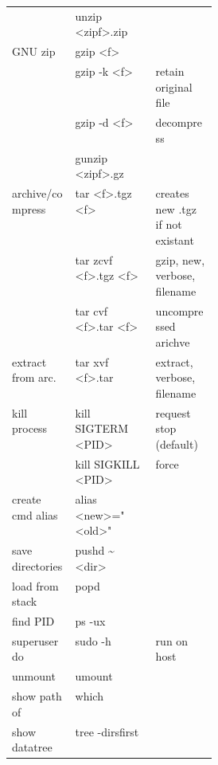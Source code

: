 {\begin{tabularx}{\linewidth}{@{} l>{\ttfamily}lp{0.3\linewidth} @{}}
                             & unzip <zipf>.zip           &                                  \\
        GNU zip              & gzip <f>                   &                                  \\
                             & gzip -k <f>                & retain original file             \\
                             & gzip -d <f>                & decompress                       \\
                             & gunzip <zipf>.gz           &                                  \\
        archive/compress     & tar <f>.tgz <f>            & creates new .tgz if not existant \\
                             & tar zcvf <f>.tgz <f>       & gzip, new, verbose, filename     \\
                             & tar cvf <f>.tar <f>        & uncompressed arichve             \\
        extract from arc.    & tar xvf <f>.tar            & extract, verbose, filename       \\
        kill process         & kill SIGTERM <PID>         & request stop (default)           \\
                             & kill SIGKILL <PID>         & force                            \\
        create cmd alias     & alias <new>="<old>"        &                                  \\
        save directories     & pushd \textasciitilde<dir> &                                  \\
        load from stack      & popd                       &                                  \\
        find PID             & ps -ux                     &                                  \\
        superuser do         & sudo -h                    & run on host                      \\
        unmount              & umount                     &                                  \\
        show path of         & which                      &                                  \\
        show datatree        & tree -dirsfirst            &                                  \\
        \bottomrule
    \end{tabularx}
} %
\renewcommand{\arraystretch}{1}
\setlength\tabcolsep{6pt} %



